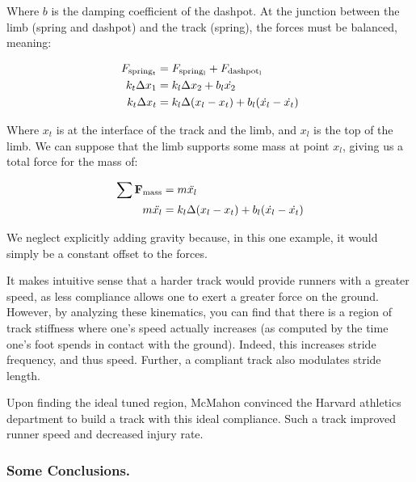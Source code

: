 Where $b$ is the damping coefficient of the dashpot. At the junction between the limb (spring and dashpot) and the track (spring), the forces must be balanced, meaning: 

\begin{equation}
\begin{split}
    F_{\rm spring_t} &= F_{\rm spring_l} + F_{\rm dashpot_l} \\
    k_t\Delta x_1 &= k_l\Delta x_2 + b_l\dot{x_2} \\
    k_t\Delta x_t &= k_l\Delta (x_l - x_t) + b_l(\dot{x_l} - \dot{x_t}) 
\end{split}
\end{equation}

Where $x_t$ is at the interface of the track and the limb, and $x_l$ is the top of the limb. We can suppose that the limb supports some mass at point $x_l$, giving us a total force for the mass of: 

\begin{equation}
\begin{split}
    \sum \mathbf{F_{\rm mass}} &= m\ddot{x_l} \\
    m\ddot{x_l} &= k_l\Delta (x_l - x_t) + b_l(\dot{x_l} - \dot{x_t}) 
\end{split}
\end{equation}

We neglect explicitly adding gravity because, in this one example, it would simply be a constant offset to the forces.\newline

It makes intuitive sense that a harder track would provide runners with a greater speed, as less compliance allows one to exert a greater force on the ground. However, by analyzing these kinematics, you can find that there is a region of track stiffness where one's speed actually increases (as computed by the time one's foot spends in contact with the ground). Indeed, this increases stride frequency, and thus speed. Further, a compliant track also modulates stride length.\newline

Upon finding the ideal tuned region, McMahon convinced the Harvard athletics department to build a track with this ideal compliance. Such a track improved runner speed and decreased injury rate.\newline

\subsubsection{Some Conclusions.}

